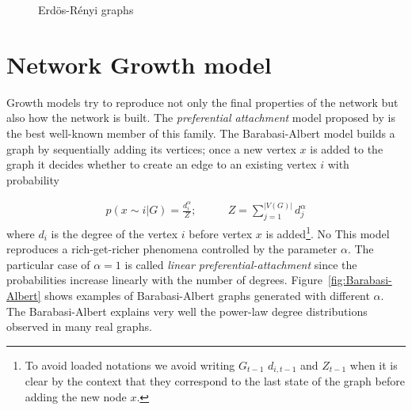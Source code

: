 \documentclass[smallextended]{svjour3}          %
\begin{document}
\begin{figure}
	\caption{Erdös-Rényi graphs}
	\label{fig:erdos_rendy}
\end{figure}


\section{Network Growth model}\label{sec:related-work}

Growth models try to reproduce not only the final properties of the network but also how the network is built. The \textit{preferential attachment} model proposed by \cite{Barabasi1999} is the best well-known member of this family.
The Barabasi-Albert model builds a graph by sequentially adding its vertices; once a new vertex $x$ is added to the graph it decides whether to create an edge to an existing vertex $i$ with probability

\begin{align}
	p(x \sim i | G) =\frac{d_{i}^\alpha}{Z}; &\qquad
	Z = \sum_{j=1}^{|V(G)|} d_j^\alpha
\end{align}
where $d_i$ is the degree of the vertex $i$ before vertex $x$ is added\footnote{To avoid loaded notations we avoid writing $G_{t-1}$ $d_{i,t-1}$ and $Z_{t-1}$ when it is clear by the context that they correspond to the last state of the graph before adding the new node $x$.}. No This model reproduces a rich-get-richer phenomena controlled by the parameter $\alpha$. The particular case of $\alpha=1$ is called \textit{linear preferential-attachment} since the probabilities increase linearly with the number of degrees. Figure~\ref{fig:Barabasi-Albert} shows examples of Barabasi-Albert graphs generated with different $\alpha$. The Barabasi-Albert explains very well the power-law degree distributions observed in many real graphs.
\end{document}
